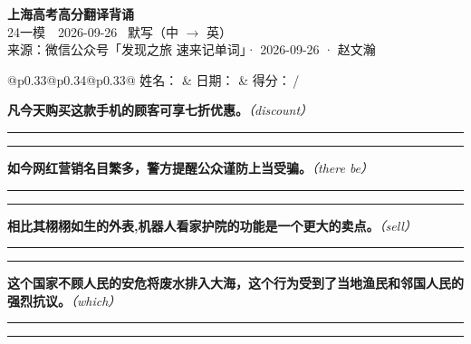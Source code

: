 \documentclass[11pt,a4paper]{article}
\newcommand{\num}[1]{\makebox[1.9em][r]{#1.}\hspace{0.3em}}
\newcommand{\wline}{\noindent\rule{\linewidth}{0.4pt}}
\newcommand{\prompt}[1]{\emph{\textcolor{tipblue}{\small（#1）}}}
\begin{document}
\pagestyle{plain}
\begin{center}
{\LARGE\bfseries 上海高考高分翻译背诵 }\\[0.25em]
{\large 24一模　2026-09-26 \quad\ 默写（中 $\to$ 英）}\\[0.35em]
{\footnotesize 来源：微信公众号「发现之旅 速来记单词」· 2026-09-26 · 赵文瀚}
\end{center}

\vspace{0.4em}
\noindent\begin{tabular}{@{}p{0.33\textwidth}@{}p{0.34\textwidth}@{}p{0.33\textwidth}@{}}
姓名：\underline{\hspace{2.0cm}} & 日期：\underline{\hspace{2.0cm}} & 得分：\underline{\hspace{1.4cm}}\,/ \\
\end{tabular}

\vspace{0.5em}

\vspace{0.8em}
\num{1}\textbf{凡今天购买这款手机的顾客可享七折优惠。}\prompt{discount}

\vspace{0.3em}

\wline\vspace{0.3em}
\wline

\num{2}\textbf{如今网红营销名目繁多，警方提醒公众谨防上当受骗。}\prompt{there be}

\vspace{0.3em}

\wline\vspace{0.3em}
\wline

\num{3}\textbf{相比其栩栩如生的外表,机器人看家护院的功能是一个更大的卖点。}\prompt{sell}

\vspace{0.3em}

\wline\vspace{0.3em}
\wline

\num{4}\textbf{这个国家不顾人民的安危将废水排入大海，这个行为受到了当地渔民和邻国人民的强烈抗议。}\prompt{which}

\vspace{0.3em}

\wline\vspace{0.3em}
\wline
\end{document}
